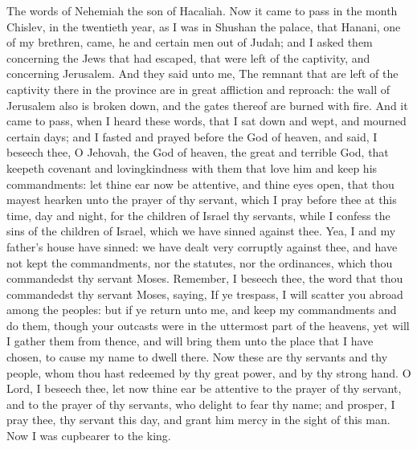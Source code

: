 


The words of Nehemiah the son of Hacaliah. Now it came to pass in the month Chislev, in the twentieth year, as I was in Shushan the palace, that Hanani, one of my brethren, came, he and certain men out of Judah; and I asked them concerning the Jews that had escaped, that were left of the captivity, and concerning Jerusalem. And they said unto me, The remnant that are left of the captivity there in the province are in great affliction and reproach: the wall of Jerusalem also is broken down, and the gates thereof are burned with fire.  And it came to pass, when I heard these words, that I sat down and wept, and mourned certain days; and I fasted and prayed before the God of heaven, and said, I beseech thee, O Jehovah, the God of heaven, the great and terrible God, that keepeth covenant and lovingkindness with them that love him and keep his commandments: let thine ear now be attentive, and thine eyes open, that thou mayest hearken unto the prayer of thy servant, which I pray before thee at this time, day and night, for the children of Israel thy servants, while I confess the sins of the children of Israel, which we have sinned against thee. Yea, I and my father’s house have sinned: we have dealt very corruptly against thee, and have not kept the commandments, nor the statutes, nor the ordinances, which thou commandedst thy servant Moses. Remember, I beseech thee, the word that thou commandedst thy servant Moses, saying, If ye trespass, I will scatter you abroad among the peoples: but if ye return unto me, and keep my commandments and do them, though your outcasts were in the uttermost part of the heavens, yet will I gather them from thence, and will bring them unto the place that I have chosen, to cause my name to dwell there. Now these are thy servants and thy people, whom thou hast redeemed by thy great power, and by thy strong hand. O Lord, I beseech thee, let now thine ear be attentive to the prayer of thy servant, and to the prayer of thy servants, who delight to fear thy name; and prosper, I pray thee, thy servant this day, and grant him mercy in the sight of this man. Now I was cupbearer to the king. 

